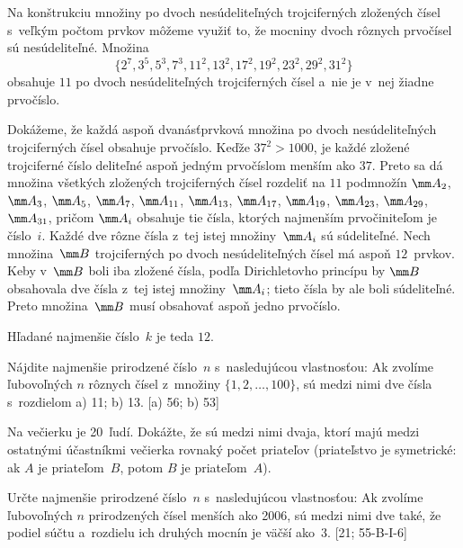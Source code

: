 {%
Na konštrukciu množiny po dvoch nesúdeliteľných trojciferných zložených čísel s~veľkým počtom prvkov môžeme využiť to, že mocniny dvoch rôznych prvočísel sú nesúdeliteľné. Množina 
$$
\{2^7, 3^5, 5^3, 7^3, 11^2, 13^2, 17^2, 19^2, 23^2, 29^2, 31^2\}
$$ 
obsahuje $11$ po dvoch nesúdeliteľných trojciferných čísel a~nie je v~nej žiadne prvočíslo.

Dokážeme, že každá aspoň dvanásťprvková množina po dvoch nesúdeliteľných trojciferných čísel obsahuje prvočíslo. Keďže $37^2>1000$, je každé zložené trojciferné číslo deliteľné aspoň jedným prvočíslom menším ako $37$. Preto sa dá množina všetkých zložených trojciferných čísel rozdeliť na $11$ podmnožín 
$\mm A_2$, $\mm A_3$, $\mm A_5$, $\mm A_7$, $\mm A_{11}$, $\mm A_{13}$, $\mm A_{17}$, $\mm A_{19}$, $\mm A_{23}$, $\mm A_{29}$, $\mm A_{31}$,
pričom $\mm A_i$ obsahuje tie čísla, ktorých najmenším prvočiniteľom je číslo~$i$. Každé dve rôzne čísla z~tej istej množiny~$\mm A_i$ sú súdeliteľné. Nech množina~$\mm B$ trojciferných po dvoch nesúdeliteľných čísel má aspoň $12$~prvkov. Keby v~$\mm B$ boli iba zložené čísla, podľa Dirichletovho princípu by $\mm B$ obsahovala dve čísla z~tej istej množiny~$\mm A_i$; tieto čísla by ale boli súdeliteľné. Preto množina~$\mm B$ musí obsahovať aspoň jedno prvočíslo.

Hľadané najmenšie číslo~$k$ je teda $12$.

Nájdite najmenšie prirodzené číslo~$n$ s~nasledujúcou vlastnosťou: Ak zvolíme ľubovoľných $n$ rôznych čísel z~množiny $\{1,2,\dots,100\}$, sú medzi nimi dve čísla s~rozdielom a) 11; b) 13. [a) 56; b) 53]

Na večierku je 20~ľudí. Dokážte, že sú medzi nimi dvaja, ktorí majú medzi ostatnými účastníkmi večierka rovnaký počet priateľov (priateľstvo je symetrické: ak $A$ je priateľom~$B$, potom $B$ je priateľom~$A$).

Určte najmenšie prirodzené číslo~$n$ s~nasledujúcou vlastnosťou: Ak zvolíme ľubovoľných $n$ prirodzených čísel menších ako 2006, sú medzi nimi dve také, že podiel súčtu a~rozdielu ich druhých mocnín je väčší ako~3. [21; 55-B-I-6]

}

